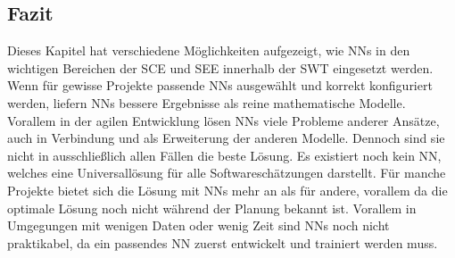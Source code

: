 \subsection{Fazit}
Dieses Kapitel hat verschiedene Möglichkeiten aufgezeigt, wie NNs in den wichtigen Bereichen der SCE und SEE innerhalb der SWT eingesetzt werden. Wenn für gewisse Projekte passende NNs ausgewählt und korrekt konfiguriert werden, liefern NNs bessere Ergebnisse als reine mathematische Modelle. Vorallem in der agilen Entwicklung lösen NNs viele Probleme anderer Ansätze, auch in Verbindung und als Erweiterung der anderen Modelle.
Dennoch sind sie nicht in ausschließlich allen Fällen die beste Lösung. Es existiert noch kein NN, welches eine Universallösung für alle Softwareschätzungen darstellt. Für manche Projekte bietet sich die Lösung mit NNs mehr an als für andere, vorallem da die optimale Lösung noch nicht während der Planung bekannt ist. Vorallem in Umgegungen mit wenigen Daten oder wenig Zeit sind NNs noch nicht praktikabel, da ein passendes NN zuerst entwickelt und trainiert werden muss.